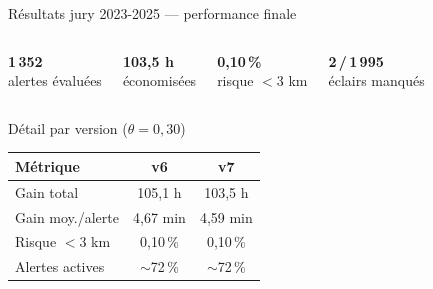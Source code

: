 \documentclass[aspectratio=169,t,11pt]{beamer}
\begin{document}
\begin{frame}{Résultats jury 2023-2025 — performance finale}
\vspace{-2pt}

\begin{columns}[c]
\begin{tcolorbox}[mybox,colback=metMid!10,colframe=metMid,
  halign=center,top=5pt,bottom=5pt]
{\large\bfseries\color{metMid}1\,352}\\[2pt]
\small alertes évaluées
\end{tcolorbox}
\begin{tcolorbox}[mybox,colback=metGreen!10,colframe=metGreen,
  halign=center,top=5pt,bottom=5pt]
{\large\bfseries\color{metGreen}103{,}5 h}\\[2pt]
\small économisées
\end{tcolorbox}
\begin{tcolorbox}[mybox,colback=metGreen!10,colframe=metGreen,
  halign=center,top=5pt,bottom=5pt]
{\large\bfseries\color{metGreen}0{,}10\,\%}\\[2pt]
\small risque $<$3 km
\end{tcolorbox}
\begin{tcolorbox}[mybox,colback=metGreen!10,colframe=metGreen,
  halign=center,top=5pt,bottom=5pt]
{\large\bfseries\color{metGreen}2\,/\,1\,995}\\[2pt]
\small éclairs manqués
\end{tcolorbox}
\end{columns}

\vspace{6pt}
\begin{columns}[T]
\begin{block}{Détail par version ($\theta=0{,}30$)}
\small
\begin{tabular}{lcc}
\toprule
\textbf{Métrique} & \textbf{v6} & \textbf{v7} \\
\midrule
Gain total          & 105,1 h    & 103,5 h    \\
Gain moy./alerte    & 4,67 min   & 4,59 min   \\
Risque $<3$ km      & 0,10\,\%   & 0,10\,\%   \\
Alertes actives     & $\sim$72\,\% & $\sim$72\,\% \\
\bottomrule
\end{tabular}
\end{block}


\end{columns}
\end{frame}
\end{document}
